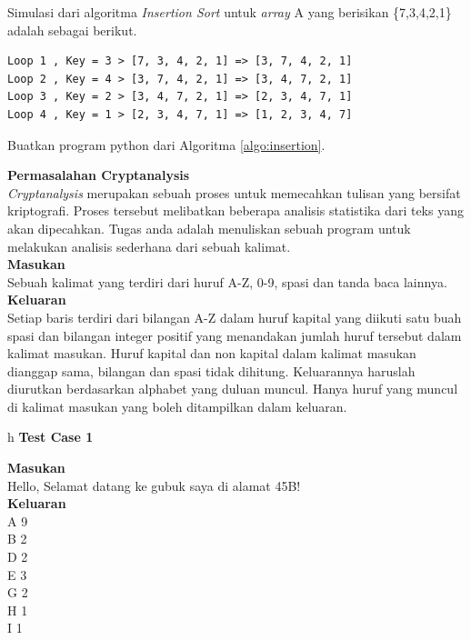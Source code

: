 Simulasi dari algoritma \textit{Insertion Sort} untuk \textit{array} A yang berisikan \{7,3,4,2,1\} adalah sebagai berikut.
\begin{verbatim}
Loop 1 , Key = 3 > [7, 3, 4, 2, 1] => [3, 7, 4, 2, 1]
Loop 2 , Key = 4 > [3, 7, 4, 2, 1] => [3, 4, 7, 2, 1]
Loop 3 , Key = 2 > [3, 4, 7, 2, 1] => [2, 3, 4, 7, 1]
Loop 4 , Key = 1 > [2, 3, 4, 7, 1] => [1, 2, 3, 4, 7]
\end{verbatim}

\begin{pemrograman}
Buatkan program python dari Algoritma \ref{algo:insertion}.
\end{pemrograman}

\begin{pemrograman}
\label{lat:cryptanalysis}
\textbf{Permasalahan Cryptanalysis}\\
\textit{Cryptanalysis} merupakan sebuah proses untuk memecahkan tulisan yang bersifat kriptografi. Proses tersebut melibatkan beberapa analisis statistika dari teks yang akan dipecahkan. Tugas anda adalah menuliskan sebuah program untuk melakukan analisis sederhana dari sebuah kalimat.\\
\textbf{Masukan}\\
Sebuah kalimat yang terdiri dari huruf A-Z, 0-9, spasi dan tanda baca lainnya.\\
\textbf{Keluaran}\\
Setiap baris terdiri dari bilangan A-Z dalam huruf kapital yang diikuti satu buah spasi dan bilangan integer positif yang menandakan jumlah huruf tersebut dalam kalimat masukan. Huruf kapital dan non kapital dalam kalimat masukan dianggap sama, bilangan dan spasi tidak dihitung. Keluarannya haruslah diurutkan berdasarkan alphabet yang duluan muncul. Hanya huruf yang muncul di kalimat masukan yang boleh ditampilkan dalam keluaran.\\
\begin{center}h
\textbf{Test Case 1}\\
\end{center}
\textbf{Masukan}\\
Hello, Selamat datang ke gubuk saya di alamat 45B!\\
\textbf{Keluaran}\\
A 9\\
B 2\\
D 2\\
E 3\\
G 2\\
H 1\\
I 1\\

\end{pemrograman}
